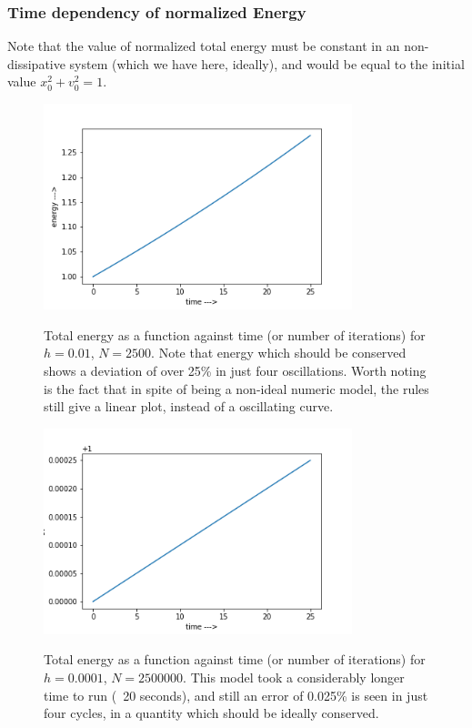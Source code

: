 \documentclass{report}
\begin{document}
\subsubsection*{Time dependency of normalized Energy}
Note that the value of normalized total energy must be constant in an non-dissipative system (which we have here, ideally), and would be equal to the initial value $x_0^2 + v_0^2 = 1$.
\begin{figure}[H]
	\centering
	\includegraphics[width = 0.8\textwidth]{energye1.png}
	\label{en1e}
	\caption{Total energy as a function against time (or number of iterations) for $h=0.01$, $N=2500$. Note that energy which should be conserved shows a deviation of over 25\% in just four oscillations. Worth noting is the fact that in spite of being a non-ideal numeric model, the rules still give a linear plot, instead of a oscillating curve.}
\end{figure}
\begin{figure}[H]
	\centering
	\includegraphics[width = 0.8\textwidth]{energye2.png}
	\label{en2e}
	\caption{Total energy as a function against time (or number of iterations) for $h=0.0001$, $N=2500000$. This model took a considerably longer time to run (~20 seconds), and still an error of 0.025\% is seen in just four cycles, in a quantity which should be ideally conserved.}
\end{figure}
\end{document}
